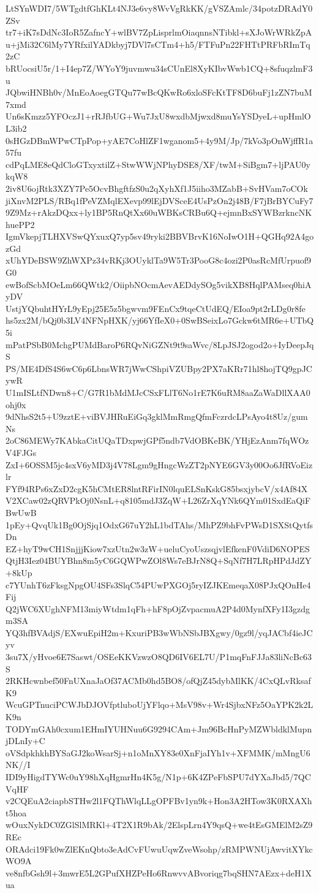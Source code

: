 LtSYnWDI7/5WTgdtfGhKLt4NJ3e6vy8WvVgRkKK/gVSZAmlc/34potzDRAdY0ZSv
tr7+iK7sDdNc3IoR5ZafncY+wlBV7ZpLisprlmOiaqnnsNTibkl+sXJoWrWRkZpA
u+jMi32C6lMy7YRfxilYADkbyj7DVl7sCTm4+h5/FTFuPn22FHTtPRFbRImTq2zC
bRUocsiU5r/1+I4ep7Z/WYoY9juvmwu34sCUnEl8XyKIbvWwb1CQ+8sfuqzlmF3u
JQbwiHNBh0v/MnEoAoegGTQu77wBcQKwRo6xloSFcKtTF8D6buFj1zZN7buM7xmd
Un6sKmzz5YFOczJ1+rRJfbUG+Wu7JxU8wxdbMjwxd8muYsYSDyeL+upHmlOL3ib2
0sHGzDBmWPwCTpPop+yAE7CoHlZF1wganom5+4y9M/Jp/7kVo3pOnWjffR1a57fu
cdPqLME8eQdCloGTxyxtilZ+StwWWjNPhyDSE8/XF/twM+SiBgm7+ljPAU0ykqW8
2iv8U6ojRtk3XZY7Pe5OcvBhgftfzS0u2qXyhXf1J5iiho3MZabB+SvHVam7oCOk
jiXnvM2PLS/RBq1fPeVZMqlEXevp99lEjDVSceE4UsPzOn2j48B/F7jBrBYCuFy7
9Z9Mz+rAkzDQxx+ly1BP5RnQtXx60uWBKsCRBu6Q+ejmnBxSYWBzrkncNKhuePP2
IgmVkepjTLHXVSwQYxuxQ7yp5sv49ryki2BBVBrvK16NoIwO1H+QGHq92A4gozGd
xUhYDeBSW9ZhWXPz34vRKj3OUyklTa9W5Tr3PooG8c4ozi2P0asRcMfUrpuof9G0
ewBofScbMOeLm66QWtk2/OiipbNOcmAevAEDdySOg5vikXB8HqlPAMseq0hiAyDV
UstjYQbuhtHYrL9yEpj25E5z5bgwvm9FEnCx9tqeCtUdEQ/EIoa9pt2rLDg0r8fe
hs5zx2M/bQj0b3LV4NFNpHXK/yj66YfIeX0+0SwBSeixLo7Gckw6tMR6e+UTbQ5i
mPatPSbB0MchgPUMdBaroP6RQvNiGZNt9t9saWvc/8LpJSJ2ogod2o+IyDeepJqS
PS/ME4DfS4S6wC6p6LbnsWR7jWwCShpiVZUBpy2PX7aKRr71hl8hojTQ9gpJCywR
U1mISLtfNDwn8+C/G7R1bMdMJcCSxFLlT6No1rE7K6uRM8aaZaWaDllXAA0ohj0x
9dNhsS2t5+U9zztE+viBVJHRuEiGq3gklMmRmgQfmFczrdcLPsAyo4t8Uz/gumNs
2oC86MEWy7KAbkaCitUQaTDxpwjGPf5ndb7VdOBKeBK/YHjEzAnm7fqWOzV4FJGs
ZxI+6OSSM5jc4sxV6yMD3j4V78Lgm9gHngcWzZT2pNYE6GV3y00Oo6JfRVoEizlr
FYf94RPs6xZxD2cgK5hCMtER8lntRFirIN0lquELSnKskG85bsxjybcV/x4Af84X
V2XCaw02zQRVPkOj0NsnL+q8105mdJ3ZqW+L26ZrXqYNk6QYm01SxdEaQiFBwUwB
1pEy+QvqUk1Bg0OjSjq1OdxG67uY2hL1bdTAhs/MhPZ9bhFvPWsD1SXStQytfsDn
EZ+hyT9wCH1SnjjjKiow7xzUtn2w3zW+ueluCyoUszsqjvlEfkenF0VdiD6NOPES
QtjH3Iez04BUYBhn8m5yC6GQWPwZOl8Ws7eBJrN8Q+SqNf7H7LRpHPdJdZY+8kUp
c7YUnhT6zFksgNpgOU4SFs3SlqC54PUwPXGOj5ryIZJKEmeqaX08PJxQOnHe4Fij
Q2jWC6XUghNFM13miyWtdm1qFh+hF8pOjZvpacmuA2P4d0MynfXFy1I3gzdgm3SA
YQ3hfBVAdjS/EXwuEpiH2m+KxuriPB3wWbNSbJBXgwy/0gz9l/yqJACbf4ieJCyv
3su7X/yHvoe6E7Saswt/OSEeKKVzwzO8QD6IV6EL7U/P1mqFnFJJa83liNcBc63S
2RKHcwnbef50FnUXnaJaOf37ACMb0hd5BO8/ofQjZ45dybMlKK/4CxQLvRksafK9
WcuGPTnuciPCWJbDJOVfptluboUjYFlqo+MsV98v+Wr4SjbxNFz5OaYPK2k2LK9n
TODYmGAh0cxum1EHmIYUHNuu6G9294CAm+Jm96BcHnPyMZWbldklMupnjDLnIy+C
oVSdpkhkhBYSaGJ2koWsarSj+n1oMnXY83e0XnFjaIYh1v+XFMMK/mMngU6NK//I
IDI9yHigdTYWc0uY98hXqHgmrHn4K5g/N1p+6K4ZPeFbSPU7dYXaJbd5/7QCVqHF
v2CQEuA2ciapbSTHw2l1FQThWlqLLgOPFBv1yn9k+Hon3A2HTow3K0RXAXht5hoa
wOuxNykDC0ZGlSlMRKl+4T2X1R9bAk/2ElspLrn4Y9qsQ+we4tEsGMElM2sZ9REc
ORAdci19Fk0wZlEKnQbto3eAdCvFUwuUqwZveWsohp/zRMPWNUjAwvitXYkcWO9A
ve8nfbGsh9l+3mwrE5L2GPufXHZPeHo6RnwvvABvoriqg7bqSHN7AEzx+deH1Xua
